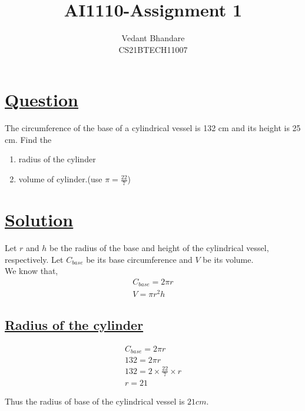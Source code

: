 \documentclass[journal,12pt,twocolumn]{IEEEtran}
\begin{document}
\raggedbottom
\setlength{\parindent}{0pt}
\vspace{3cm}
\title{AI1110-Assignment 1}
\author{Vedant Bhandare\\CS21BTECH11007}
\maketitle
\newpage
\bigskip
\renewcommand{\thefigure}{\theenumi}
\renewcommand{\thetable}{\theenumi}

\section{\underline{\textbf{Question}}}
The circumference of the base of a cylindrical vessel is 132 cm and its height is 25 cm. Find the

\begin{enumerate}
    \item radius of the cylinder
    \item volume of cylinder.(use $\pi = \frac{22}{7}$)
\end{enumerate}
\section{\underline{\textbf{Solution}}}
Let $r$ and $h$ be the radius of the base and height of the cylindrical vessel, respectively.
Let $C_{base}$ be its base circumference and $V$ be its volume.\\

We know that,
\begin{align}
    C_{base} = 2\pi{r}\\
    V = \pi{r^2h}
\end{align}

\subsection{\underline{\textbf{Radius of the cylinder}}}
\begin{align}
C_{base} = 2\pi{r}\\
132 = 2\pi{r}\\
132 = 2\times\frac{22}{7}\times{r}\\
r = 21
\end{align}
\begin{center}
    Thus the radius of base of the cylindrical vessel is $21 cm$.
\end{center}
\end{document}
